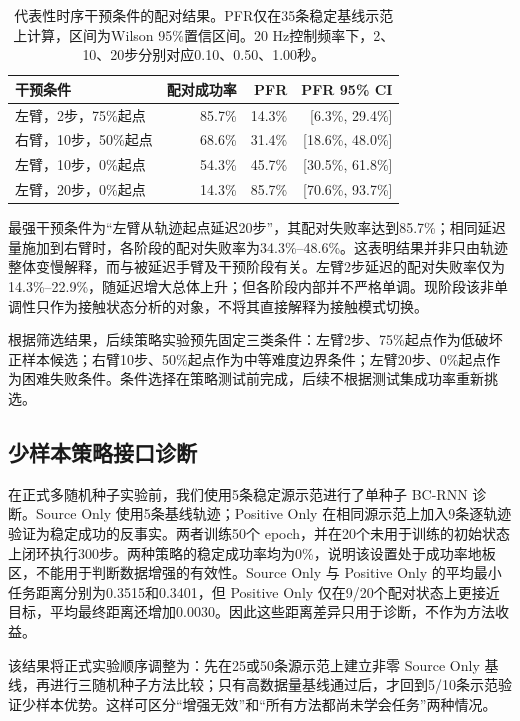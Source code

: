 \begin{table}[t]
\centering
\caption{代表性时序干预条件的配对结果。PFR仅在35条稳定基线示范上计算，区间为Wilson 95\%置信区间。20 Hz控制频率下，2、10、20步分别对应0.10、0.50、1.00秒。}
\label{tab:screening}
\begin{tabular}{lrrr}
\toprule
干预条件 & 配对成功率 & PFR & PFR 95\% CI \\
\midrule
左臂，2步，75\%起点 & 85.7\% & 14.3\% & [6.3\%, 29.4\%] \\
右臂，10步，50\%起点 & 68.6\% & 31.4\% & [18.6\%, 48.0\%] \\
左臂，10步，0\%起点 & 54.3\% & 45.7\% & [30.5\%, 61.8\%] \\
左臂，20步，0\%起点 & 14.3\% & 85.7\% & [70.6\%, 93.7\%] \\
\bottomrule
\end{tabular}
\end{table}

最强干预条件为“左臂从轨迹起点延迟20步”，其配对失败率达到85.7\%；相同延迟量施加到右臂时，各阶段的配对失败率为34.3\%--48.6\%。这表明结果并非只由轨迹整体变慢解释，而与被延迟手臂及干预阶段有关。左臂2步延迟的配对失败率仅为14.3\%--22.9\%，随延迟增大总体上升；但各阶段内部并不严格单调。现阶段该非单调性只作为接触状态分析的对象，不将其直接解释为接触模式切换。

根据筛选结果，后续策略实验预先固定三类条件：左臂2步、75\%起点作为低破坏正样本候选；右臂10步、50\%起点作为中等难度边界条件；左臂20步、0\%起点作为困难失败条件。条件选择在策略测试前完成，后续不根据测试集成功率重新挑选。

\subsection{少样本策略接口诊断}

在正式多随机种子实验前，我们使用5条稳定源示范进行了单种子 BC-RNN 诊断。Source Only 使用5条基线轨迹；Positive Only 在相同源示范上加入9条逐轨迹验证为稳定成功的反事实。两者训练50个 epoch，并在20个未用于训练的初始状态上闭环执行300步。两种策略的稳定成功率均为0\%，说明该设置处于成功率地板区，不能用于判断数据增强的有效性。Source Only 与 Positive Only 的平均最小任务距离分别为0.3515和0.3401，但 Positive Only 仅在9/20个配对状态上更接近目标，平均最终距离还增加0.0030。因此这些距离差异只用于诊断，不作为方法收益。

该结果将正式实验顺序调整为：先在25或50条源示范上建立非零 Source Only 基线，再进行三随机种子方法比较；只有高数据量基线通过后，才回到5/10条示范验证少样本优势。这样可区分“增强无效”和“所有方法都尚未学会任务”两种情况。

